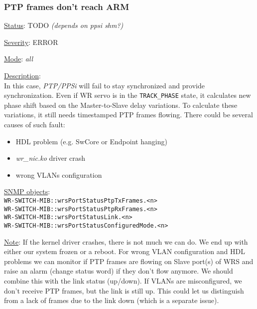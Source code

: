 \subsubsection{\bf PTP frames don't reach ARM}
		\label{fail:timing:no_frames}
		\begin{packed_enum}
			\item [] \underline{Status}: TODO \emph{(depends on ppsi shm?)}
			\item [] \underline{Severity}: ERROR
			\item [] \underline{Mode}: \emph{all}
			\item [] \underline{Description}:\\
				In this case, \emph{PTP/PPSi} will fail to stay synchronized and provide
				synchronization. Even if WR servo is in the \texttt{TRACK\_PHASE} state,
				it calculates new phase shift based on the Master-to-Slave delay
				variations. To calculate these variations, it still needs timestamped
				PTP frames flowing. There could be several causes of such fault:
				\begin{itemize}
					\item HDL problem (e.g. SwCore or Endpoint hanging)
					\item \emph{wr\_nic.ko} driver crash
					\item wrong VLANs configuration
				\end{itemize}
			\item [] \underline{SNMP objects}:\\
				\texttt{WR-SWITCH-MIB::wrsPortStatusPtpTxFrames.<n>}\\
				\texttt{WR-SWITCH-MIB::wrsPortStatusPtpRxFrames.<n>}\\
				\texttt{WR-SWITCH-MIB::wrsPortStatusLink.<n>}\\
				\texttt{WR-SWITCH-MIB::wrsPortStatusConfiguredMode.<n>}
			\item [] \underline{Note}: If the kernel driver crashes, there is not much
				we can do. We end up with either our system frozen or a reboot. For
				wrong VLAN configuration and HDL problems we can monitor if PTP frames
				are flowing on Slave port(s) of WRS and raise an alarm (change status
				word) if they don't flow anymore. We should combine this with the link
				status (up/down). If VLANs are misconfigured, we don't receive PTP
				frames, but the link is still up. This could let us distinguish from a
				lack of frames due to the link down (which is a separate issue).
		\end{packed_enum}

